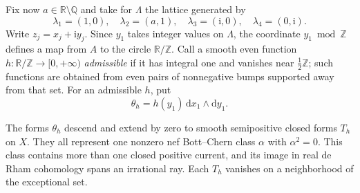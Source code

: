Fix now $a\in\mathbb R\setminus\mathbb Q$ and take for $\Lambda$ the lattice generated by
\[
 \lambda_1=(1,0),\quad \lambda_2=(a,1),\quad
 \lambda_3=(\mathrm i,0),\quad \lambda_4=(0,\mathrm i).
\]
Write $z_j=x_j+\mathrm i y_j$. Since $y_1$ takes integer values on $\Lambda$, the coordinate $y_1\bmod\mathbb Z$ defines a map from $A$ to the circle $\mathbb R/\mathbb Z$. Call a smooth even function $h\colon\mathbb R/\mathbb Z\to[0,+\infty)$ \emph{admissible} if it has integral one and vanishes near $\frac12\mathbb Z$; such functions are obtained from even pairs of nonnegative bumps supported away from that set. For an admissible $h$, put
\[
 \theta_h=h(y_1)\,\mathrm dx_1\wedge\mathrm dy_1.
\]

\begin{proposition}\label{prop:kummer-nonrigid-irrational}
The forms $\theta_h$ descend and extend by zero to smooth semipositive closed forms $T_h$ on $X$. They all represent one nonzero nef Bott--Chern class $\alpha$ with $\alpha^2=0$. This class contains more than one closed positive current, and its image in real de Rham cohomology spans an irrational ray. Each $T_h$ vanishes on a neighborhood of the exceptional set.
\end{proposition}
